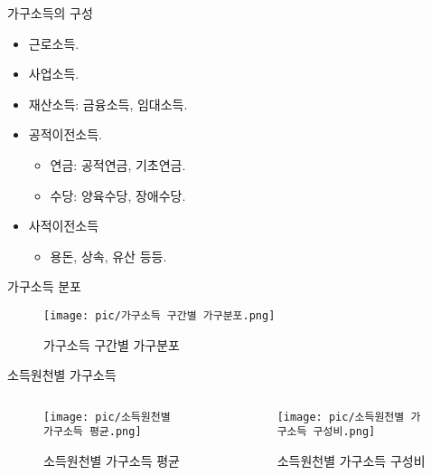 \documentclass[aspectratio=169,xcolor=dvipsnames,handout]{beamer}
\begin{document}
\begin{frame}{가구소득의 구성}
    \begin{itemize}
        \item 근로소득.
        \item 사업소득.
        \item 재산소득: 금융소득, 임대소득.
        \item 공적이전소득.
        \begin{itemize}
            \item 연금: 공적연금, 기초연금.
            \item 수당: 양육수당, 장애수당.
        \end{itemize}
        \item 사적이전소득
        \begin{itemize}
            \item 용돈, 상속, 유산 등등. 
        \end{itemize}
    \end{itemize}
\end{frame}

\begin{frame}{가구소득 분포}
\centering
\begin{figure}
    \texttt{[image: pic/가구소득 구간별 가구분포.png]}
    \caption{가구소득 구간별 가구분포}
\end{figure}

\end{frame}
\begin{frame}{소득원천별 가구소득}
\begin{columns}
    \begin{column}{.5\textwidth}
        \begin{figure}
            \centering
            \texttt{[image: pic/소득원천별 가구소득 평균.png]}
            \caption{소득원천별 가구소득 평균}
        \end{figure}
    \end{column}    
    \begin{column}{.5\textwidth}
        \begin{figure}
            \centering
            \texttt{[image: pic/소득원천별 가구소득 구성비.png]}
            \caption{소득원천별 가구소득 구성비}
        \end{figure}
    \end{column}    
\end{columns}
\end{frame}
\end{document}
